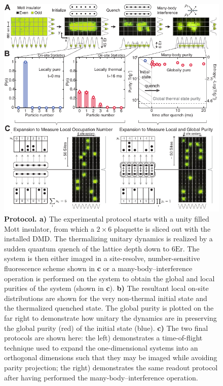 \begin{figure}[t!]
		\includegraphics[width=\columnwidth]{figures/ch4/fig2_protocol.pdf} 
		\caption{\textbf{Protocol. a)} The experimental protocol starts with a unity filled Mott insulator, from which a $2\times6$ plaquette is sliced out with the installed DMD. The thermalizing unitary dynamics is realized by a sudden quantum quench of the lattice depth down to $6\mathrm{Er}$. The system is then either imaged in a site-resolve, number-sensitive fluorescence scheme shown in \textbf{c} or a many-body--interference operation is performed on the system to obtain the global and local purities of the system (shown in \textbf{c}). \textbf{b)} The resultant local on-site distributions are shown for the very non-thermal initial state and the thermalized quenched state. The global purity is plotted on the far right to demonstrate how unitary the dynamics are in preserving the global purity (red) of the initial state (blue). \textbf{c)} The two final protocols are shown here: the left) demonstrates a time-of-flight technique used to expand the one-dimensional systems into an orthogonal dimensions such that they may be imaged while avoiding parity projection; the right) demonstrates the same readout protocol after having performed the many-body--interference operation.}
		\label{fig:eth_protocol}	
\end{figure}

